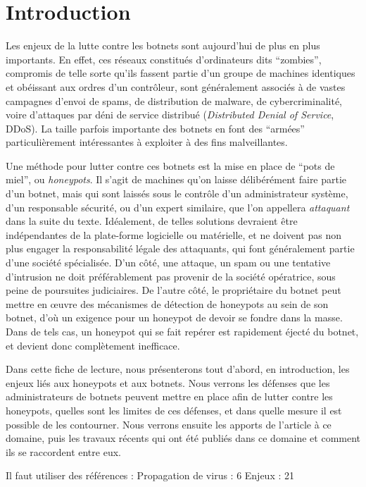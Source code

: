\section*{Introduction}

Les enjeux de la lutte contre les botnets sont aujourd'hui de plus en plus
importants. En effet, ces réseaux constitués d'ordinateurs dits ``zombies'',
compromis de telle sorte qu'ils fassent partie d'un groupe de machines
identiques et obéissant aux ordres d'un contrôleur, sont généralement associés
à de vastes campagnes d'envoi de spams, de distribution de malware, de
cybercriminalité, voire d'attaques par déni de service distribué
(\textit{Distributed Denial of Service}, DDoS).  La taille parfois importante
des botnets en font des ``armées'' particulièrement intéressantes à exploiter à
des fins malveil\-lantes.

Une méthode pour lutter contre ces botnets est la mise en place de ``pots de
miel'', ou \textit{honeypots}.  Il s'agit de machines qu'on laisse délibérément
faire partie d'un botnet, mais qui sont laissés sous le contrôle d'un
administrateur système, d'un responsable sécurité, ou d'un expert similaire,
que l'on appellera \textit{attaquant} dans la suite du texte.  Idéalement, de
telles solutions devraient être indépendantes de la plate-forme logicielle ou
matérielle, et ne doivent pas non plus engager la responsabilité légale des
attaquants, qui font généralement partie d'une société spécialisée.  D'un côté,
une attaque, un spam ou une tentative d'intrusion ne doit préférablement pas
provenir de la société opératrice, sous peine de poursuites judiciaires. De
l'autre côté, le propriétaire du botnet peut mettre en œuvre des mécanismes de
détection de honeypots au sein de son botnet, d'où un exigence pour un honeypot
de devoir se fondre dans la masse.  Dans de tels cas, un honeypot qui se fait
repérer est rapidement éjecté du botnet, et devient donc complètement
inefficace.

Dans cette fiche de lecture, nous présenterons tout d'abord, en introduction,
les enjeux liés aux honeypots et aux botnets. Nous verrons les défenses que les
administrateurs de botnets peuvent mettre en place afin de lutter contre les
honeypots, quelles sont les limites de ces défenses, et dans quelle mesure il
est possible de les contourner. Nous verrons ensuite les apports de l'article à
ce domaine, puis les travaux récents qui ont été publiés dans ce domaine et
comment ils se raccordent entre eux.


Il faut utiliser des références :
Propagation de virus : 6
Enjeux : 21
